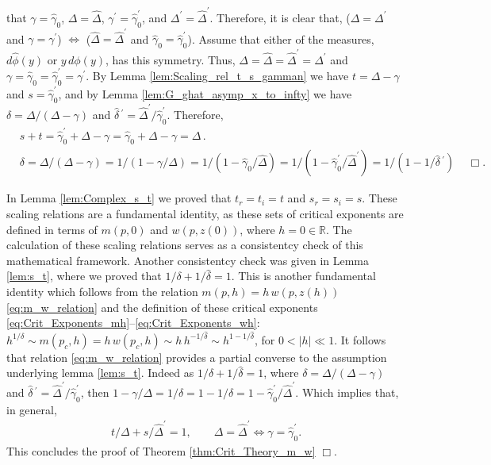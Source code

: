 \documentclass[english,12pt,jmp,graphicx]{revtex4-1}
\newcommand{\ph}{\hat{\phi}}
\newcommand{\gh}{\hat{\gamma}}
\newcommand{\Dh}{\hat{\Delta}}
\newcommand{\dha}{\hat{\delta}}
\begin{document}
that $\gamma=\gh_0$, $\Delta=\Dh$, $\gamma^\prime=\gh_0^\prime$, and $\Delta^\prime=\Dh^\prime$. Therefore, it
is clear that, ($\Delta=\Delta^\prime$ and $\gamma=\gamma^\prime$) $\iff$ ($\Dh=\Dh^\prime$ and
$\gh_0=\gh_0^\prime$). Assume that either of the measures, $d\ph(y)$
or $y\,d\phi(y)$, has this symmetry. Thus, $\Delta=\Dh=\Dh^\prime=\Delta^\prime$ and
$\gamma=\gh_0=\gh_0^\prime=\gamma^\prime$. By
Lemma \ref{lem:Scaling_rel_t_s_gamman} we have $t=\Delta-\gamma$ and
$s=\gh_0^\prime$, and by Lemma \ref{lem:G_ghat_asymp_x_to_infty} we have
$\delta=\Delta/(\Delta-\gamma)$ and $\dha\,^\prime=\Dh^\prime/\gh_0^\prime$. Therefore,    
%
\begin{align*}
  &s+t=\gh_0^\prime+\Delta-\gamma=\gh_0+\Delta-\gamma=\Delta\,.\\
  &\delta=\Delta/(\Delta-\gamma)=1/(1-\gamma/\Delta)=1/(1-\gh_0/\Dh)=1/(1-\gh_0^\prime/\Dh^\prime)=1/(1-1/\dha\,^\prime)\,
  \quad \Box.
\end{align*}

In Lemma \ref{lem:Complex_s_t} we proved that $t_r=t_i=t$ and
$s_r=s_i=s$. These scaling relations are a fundamental identity, as 
these sets of critical exponents are defined in terms of $m(p,0)$ and
$w(p,z(0))$, where $h=0\in\mathbb{R}$. The calculation of these 
scaling relations serves as a consistentcy check of this mathematical
framework. Another consistentcy check was given in Lemma \ref{lem:s_t},
where we proved that $1/\delta+1/\dha=1$. This is another fundamental
identity which follows from the relation $m(p,h)=h\,w(p,z(h))$
\eqref{eq:m_w_relation} and the definition of these critical exponents
\eqref{eq:Crit_Exponents_mh}--\eqref{eq:Crit_Exponents_wh}:
$h^{1/\delta}\sim m(p_c,h)=h\,w(p_c,h)\sim h\,h^{-1/\dha}\sim h^{1-1/\dha}$, for $0<|h|\ll1$. It follows 
that relation \eqref{eq:m_w_relation} provides a partial converse to
the assumption underlying lemma \ref{lem:s_t}. Indeed as
$1/\delta+1/\dha=1$, where $\delta=\Delta/(\Delta-\gamma)$ and $\dha\,^\prime=\Dh^\prime/\gh_0^\prime$, then
$1-\gamma/\Delta=1/\delta=1-1/\dha=1-\gh_0^\prime/\Dh^\prime$. Which implies that, in general,
%
\begin{align}
  t/\Delta+s/\Dh^\prime=1, \qquad
  \Delta=\Dh^\prime\iff\gamma=\gh_0^\prime.
\end{align}
%
This concludes the proof of Theorem \ref{thm:Crit_Theory_m_w} $\Box$.
%
\end{document}

